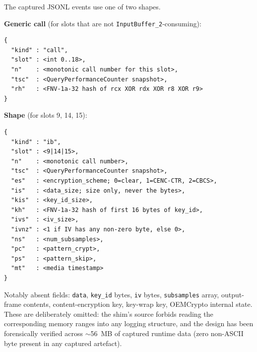 \documentclass[11pt,letterpaper]{article}
\begin{document}
The captured JSONL events use one of two shapes.

\textbf{Generic call} (for slots that are not
\texttt{InputBuffer\_2}-consuming):
\begin{lstlisting}[basicstyle=\ttfamily\footnotesize]
{
  "kind" : "call",
  "slot" : <int 0..18>,
  "n"    : <monotonic call number for this slot>,
  "tsc"  : <QueryPerformanceCounter snapshot>,
  "rh"   : <FNV-1a-32 hash of rcx XOR rdx XOR r8 XOR r9>
}
\end{lstlisting}

\textbf{Shape} (for slots 9, 14, 15):
\begin{lstlisting}[basicstyle=\ttfamily\footnotesize]
{
  "kind" : "ib",
  "slot" : <9|14|15>,
  "n"    : <monotonic call number>,
  "tsc"  : <QueryPerformanceCounter snapshot>,
  "es"   : <encryption_scheme; 0=clear, 1=CENC-CTR, 2=CBCS>,
  "is"   : <data_size; size only, never the bytes>,
  "kis"  : <key_id_size>,
  "kh"   : <FNV-1a-32 hash of first 16 bytes of key_id>,
  "ivs"  : <iv_size>,
  "ivnz" : <1 if IV has any non-zero byte, else 0>,
  "ns"   : <num_subsamples>,
  "pc"   : <pattern_crypt>,
  "ps"   : <pattern_skip>,
  "mt"   : <media timestamp>
}
\end{lstlisting}

Notably absent fields:
\texttt{data}, \texttt{key\_id} bytes, \texttt{iv} bytes,
\texttt{subsamples} array, output-frame contents, content-encryption
key, key-wrap key, OEMCrypto internal state.  These are deliberately
omitted: the shim's source forbids reading the corresponding memory
ranges into any logging structure, and the design has been
forensically verified across $\sim$56~MB of captured runtime data
(zero non-ASCII byte present in any captured artefact).
\end{document}

